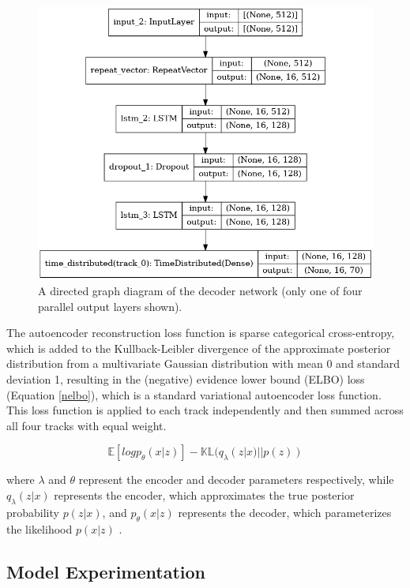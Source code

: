 \documentclass[sigconf,authorversion]{acmart}
\begin{document}
\begin{figure}[h]
  \centering
  \includegraphics[width=\linewidth]{figures/decoder.png}
  \caption{A directed graph diagram of the decoder network (only one
    of four parallel output layers shown).}
  \label{decoder}
\end{figure}


The autoencoder reconstruction loss function is sparse categorical
cross-entropy, which is added to the Kullback-Leibler divergence of
the approximate posterior distribution from a multivariate Gaussian
distribution with mean 0 and standard deviation 1, resulting in the
(negative) evidence lower bound (ELBO) loss (Equation \ref{nelbo}),
which is a standard variational autoencoder loss function. This loss
function is applied to each track independently and then summed across
all four tracks with equal weight.

\begin{equation}
  \label{nelbo}
\mathbb{E}[log{p_\theta}(x|z)]-\mathbb{KL}(q_\lambda(z|x)||p(z))
\end{equation}

where $\lambda$ and $\theta$ represent the encoder and decoder
parameters respectively, while $q_\lambda(z|x)$ represents the
encoder, which approximates the true posterior probability $p(z|x)$,
and $p_\theta(x|z)$ represents the decoder, which parameterizes the
likelihood $p(x|z)$ \cite{roberts_hierarchical_2018}.



\subsection{Model Experimentation}
\end{document}
